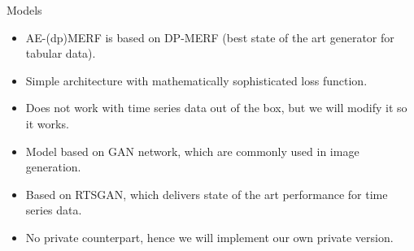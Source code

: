 \begin{frame}{Models}
    \begin{itemize}
        \item<1-> AE-(dp)MERF is based on DP-MERF (best state of the art generator for tabular data).
        \item<2-> Simple architecture with mathematically sophisticated loss function.
        \item<3-> Does not work with time series data out of the box, but we will modify it so it works.
    \end{itemize}
    \begin{itemize}
        \item<5-> Model based on GAN network, which are commonly used in image generation.
        \item<6-> Based on RTSGAN, which delivers state of the art performance for time series data.
        \item<7> No private counterpart, hence we will implement our own private version.
    \end{itemize}
    
\end{frame}

